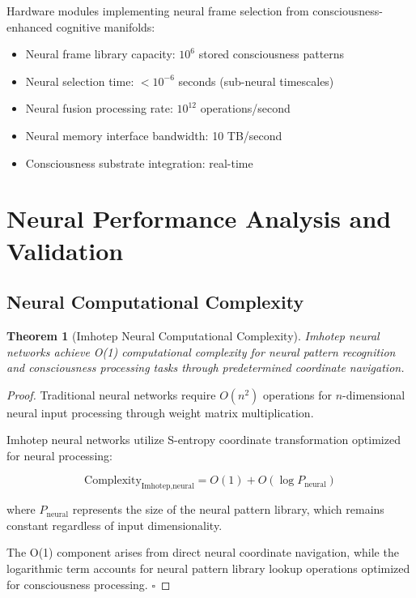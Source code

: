 \documentclass[12pt,a4paper]{article}
\newtheorem{theorem}{Theorem}[section]
\theoremstyle{remark}
\begin{document}
Hardware modules implementing neural frame selection from consciousness-enhanced cognitive manifolds:

\begin{itemize}
\item Neural frame library capacity: $10^6$ stored consciousness patterns
\item Neural selection time: $< 10^{-6}$ seconds (sub-neural timescales)
\item Neural fusion processing rate: $10^{12}$ operations/second
\item Neural memory interface bandwidth: 10 TB/second
\item Consciousness substrate integration: real-time
\end{itemize}

\section{Neural Performance Analysis and Validation}

\subsection{Neural Computational Complexity}

\begin{theorem}[Imhotep Neural Computational Complexity]
Imhotep neural networks achieve O(1) computational complexity for neural pattern recognition and consciousness processing tasks through predetermined coordinate navigation.
\end{theorem}

\begin{proof}
Traditional neural networks require $O(n^2)$ operations for $n$-dimensional neural input processing through weight matrix multiplication.

Imhotep neural networks utilize S-entropy coordinate transformation optimized for neural processing:

\begin{equation}
\text{Complexity}_{\text{Imhotep,neural}} = O(1) + O(\log P_{\text{neural}})
\end{equation}

where $P_{\text{neural}}$ represents the size of the neural pattern library, which remains constant regardless of input dimensionality.

The O(1) component arises from direct neural coordinate navigation, while the logarithmic term accounts for neural pattern library lookup operations optimized for consciousness processing. $\square$
\end{proof}
\end{document}
